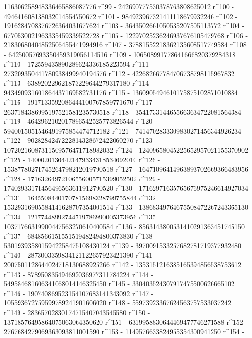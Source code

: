        116306258948336465886087776 r^99 - 
       242690777530378763808625012 r^100 - 
       494641608138032014554750672 r^101 - 
       984923967321411118679932246 r^102 - 
       1916284708376726364031677624 r^103 - 
       3643502661050535207505113772 r^104 - 
       6770530021963335459339522728 r^105 - 
       12297025236246937676105479768 r^106 - 
       21830680404852506455441994916 r^107 - 
       37881552218362135608517749584 r^108 - 
       64250057693350459319056114516 r^109 - 
       106508991778641666820379284318 r^110 - 
       172559435890289624336185223594 r^111 - 
       273209350441780938499940194576 r^112 - 
       422682667784706738798115967832 r^113 - 
       638920229621873229644279317180 r^114 - 
       943490931601864437169582731176 r^115 - 
       1360905494610175875102871010884 r^116 - 
       1917133592086444100767859771670 r^117 - 
       2637184386995197521581235730518 r^118 - 
       3541733144655663634722081564384 r^119 - 
       4642962102017896542525773826544 r^120 - 
       5940015051546491975854474712182 r^121 - 
       7414702833309830271456344926234 r^122 - 
       9028284247222814328672422060270 r^123 - 
       10720216087311509576471718982032 r^124 - 
       12409658045225652957021155370902 r^125 - 
       14000201364421479334318534692010 r^126 - 
       15387780271745264798212019790518 r^127 - 
       16471096414963893702669366483956 r^128 - 
       17163264972106556005715399052502 r^129 - 
       17402933171456496563611912790520 r^130 - 
       17162971635765676975246614927034 r^131 - 
       16455084401707815698328799755844 r^132 - 
       15329316905584141628707354001514 r^133 - 
       13868349764675508472267243365130 r^134 - 
       12177448992744719786990005373956 r^135 - 
       10371766319900447563270610400584 r^136 - 
       8563143800531410291363451745150 r^137 - 
       6848566151551519482494800373830 r^138 - 
       5301939358015942258475108430124 r^139 - 
       3970091533257682781719377932480 r^140 - 
       2873003359834121122657923421390 r^141 - 
       2007501128644024718130688925266 r^142 - 
       1353151216385165394856538753612 r^143 - 
       878950835494692036977311784224 r^144 - 
       549584681606341068014146325450 r^145 - 
       330403524307917475500626665102 r^146 - 
       190740869523154107683141343092 r^147 - 
       105593672759599789241901606020 r^148 - 
       55973923367624563757533037242 r^149 - 
       28365702830174715407043545580 r^150 - 
       13718576495864075063064350620 r^151 - 
       6319958830644469477746271588 r^152 - 
       2767684279069363093811001590 r^153 - 
       1149576633824955354300941250 r^154 - 
